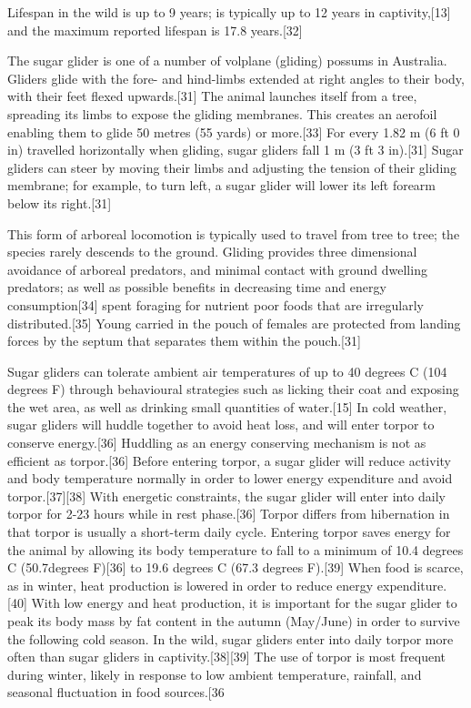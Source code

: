 \documentclass[twoside, 12pt, letterpaper]{report}\usepackage[]{graphicx}\usepackage[]{color}
\begin{document}
\begin{multicols*}{2}
Lifespan in the wild is up to 9 years; is typically up to 12 years in captivity,[13] and the maximum reported lifespan is 17.8 years.[32]

The sugar glider is one of a number of volplane (gliding) possums in Australia. Gliders glide with the fore- and hind-limbs extended at right angles to their body, with their feet flexed upwards.[31] The animal launches itself from a tree, spreading its limbs to expose the gliding membranes. This creates an aerofoil enabling them to glide 50 metres (55 yards) or more.[33] For every 1.82 m (6 ft 0 in) travelled horizontally when gliding, sugar gliders fall 1 m (3 ft 3 in).[31] Sugar gliders can steer by moving their limbs and adjusting the tension of their gliding membrane; for example, to turn left, a sugar glider will lower its left forearm below its right.[31]

This form of arboreal locomotion is typically used to travel from tree to tree; the species rarely descends to the ground. Gliding provides three dimensional avoidance of arboreal predators, and minimal contact with ground dwelling predators; as well as possible benefits in decreasing time and energy consumption[34] spent foraging for nutrient poor foods that are irregularly distributed.[35] Young carried in the pouch of females are protected from landing forces by the septum that separates them within the pouch.[31]

Sugar gliders can tolerate ambient air temperatures of up to 40 degrees C (104 degrees F) through behavioural strategies such as licking their coat and exposing the wet area, as well as drinking small quantities of water.[15] In cold weather, sugar gliders will huddle together to avoid heat loss, and will enter torpor to conserve energy.[36] Huddling as an energy conserving mechanism is not as efficient as torpor.[36] Before entering torpor, a sugar glider will reduce activity and body temperature normally in order to lower energy expenditure and avoid torpor.[37][38] With energetic constraints, the sugar glider will enter into daily torpor for 2-23 hours while in rest phase.[36] Torpor differs from hibernation in that torpor is usually a short-term daily cycle. Entering torpor saves energy for the animal by allowing its body temperature to fall to a minimum of 10.4 degrees C (50.7degrees F)[36] to 19.6 degrees C (67.3 degrees F).[39] When food is scarce, as in winter, heat production is lowered in order to reduce energy expenditure.[40] With low energy and heat production, it is important for the sugar glider to peak its body mass by fat content in the autumn (May/June) in order to survive the following cold season. In the wild, sugar gliders enter into daily torpor more often than sugar gliders in captivity.[38][39] The use of torpor is most frequent during winter, likely in response to low ambient temperature, rainfall, and seasonal fluctuation in food sources.[36


\end{multicols*}
\end{document}
